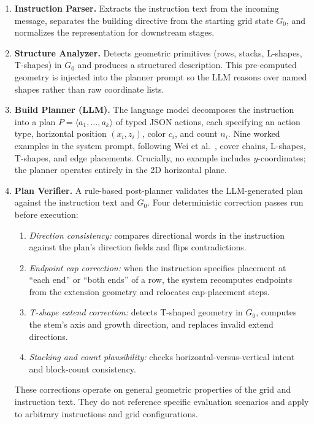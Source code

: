 \documentclass{article}
\begin{document}
\begin{enumerate}[leftmargin=*]
  \item \textbf{Instruction Parser.} Extracts the instruction text from the
    incoming message, separates the building directive from the starting grid
    state $G_0$, and normalizes the representation for downstream stages.

  \item \textbf{Structure Analyzer.} Detects geometric primitives (rows,
    stacks, L-shapes, T-shapes) in $G_0$ and produces a structured
    description. This pre-computed geometry is injected into the planner
    prompt so the LLM reasons over named shapes rather than raw coordinate
    lists.

  \item \textbf{Build Planner (LLM).} The language model decomposes the
    instruction into a plan $P = \langle a_1, \ldots, a_k \rangle$ of typed
    JSON actions, each specifying an action type, horizontal position
    $(x_i, z_i)$, color $c_i$, and count $n_i$. Nine worked examples in the
    system prompt, following Wei et al.~\cite{wei2022}, cover chains,
    L-shapes, T-shapes, and edge placements. Crucially, no example includes
    $y$-coordinates; the planner operates entirely in the 2D horizontal
    plane.

  \item \textbf{Plan Verifier.} A rule-based post-planner validates the
    LLM-generated plan against the instruction text and $G_0$.
    Four deterministic correction passes run before execution:
    \begin{enumerate}
      \item \emph{Direction consistency:} compares directional words in the
        instruction against the plan's direction fields and flips
        contradictions.
      \item \emph{Endpoint cap correction:} when the instruction specifies
        placement at ``each end'' or ``both ends'' of a row, the system
        recomputes endpoints from the extension geometry and relocates
        cap-placement steps.
      \item \emph{T-shape extend correction:} detects T-shaped geometry in
        $G_0$, computes the stem's axis and growth direction, and replaces
        invalid extend directions.
      \item \emph{Stacking and count plausibility:} checks
        horizontal-versus-vertical intent and block-count consistency.
    \end{enumerate}
    These corrections operate on general geometric properties of the grid and
    instruction text. They do not reference specific evaluation scenarios and
    apply to arbitrary instructions and grid configurations.


\end{enumerate}
\end{document}
